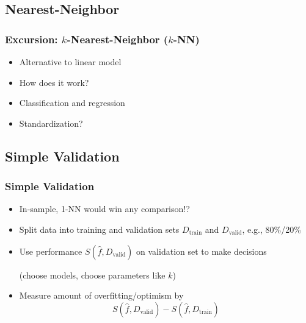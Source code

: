 \subsection{Nearest-Neighbor}

\begin{frame}
	\frametitle{Excursion: $k$-Nearest-Neighbor ($k$-NN)}
	\begin{itemize}
		\item Alternative to linear model
		\item How does it work?
		\item Classification and regression
		\item Standardization?
	\end{itemize}
	
	\vfill
	
	\begin{example}
	\end{example}
\end{frame}

\subsection{Simple Validation}

\begin{frame}
	\frametitle{Simple Validation}
	\begin{itemize}
		\item In-sample, 1-NN would win any comparison!?
		\item Split data into training and validation sets $D_\text{train}$ and $D_\text{valid}$, e.g., 80\%/20\%
		\item Use performance $S(\hat f, D_\text{valid})$ on validation set to make decisions 
		
		(choose models, choose parameters like $k$)
		\item Measure amount of overfitting/optimism by 
		$$
		S(\hat f, D_\text{valid}) - S(\hat f, D_\text{train})
		$$
	\end{itemize}
	
	\vfill
	
	\begin{example}
	\end{example}
\end{frame}

